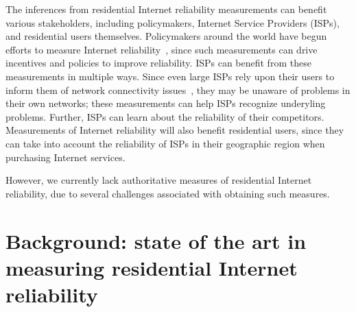  
The inferences from residential Internet reliability measurements can
benefit various stakeholders, including policymakers,
Internet Service Providers (ISPs), and residential users
themselves. Policymakers around the world have begun efforts to
measure Internet reliability~\cite{measuring-broadband-america,
measuring-broadband-canda, ofcom-uk-broadband-research,
measuring-broadband-australia}, since such measurements can drive
incentives and policies to improve reliability. ISPs can benefit from
these measurements in multiple ways. Since even large ISPs rely upon
their users to inform them of network connectivity
issues~\cite{conext10-jin}, they may be unaware of problems in their
own networks; these measurements can help ISPs recognize underyling
problems. Further, ISPs can learn about the reliability of their
competitors. Measurements of Internet reliability will also benefit
residential users, since they can take into account the reliability of
ISPs in their geographic region when purchasing Internet services.

However, we currently lack authoritative measures of residential
Internet reliability, due to several challenges associated with
obtaining such measures. 



\section{Background: state of the art in measuring residential Internet reliability}

